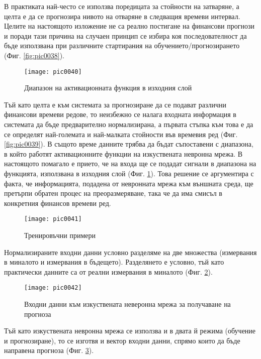 В практиката най-често се използва поредицата за стойности на затваряне, а целта е да се прогнозира нивото на отваряне в следващия времеви интервал. Целите на настоящото изложение не са реално постигане на финансови прогнози и поради тази причина на случаен принцип се избира коя последователност да бъде използвана при различните стартирания на обучението/прогнозирането (Фиг. \ref{fig:pic0038}).

\begin{figure}[h]
  \centering
  \texttt{[image: pic0040]}
  \caption{Диапазон на активационната функция в изходния слой}
\label{fig:pic0040}
\end{figure}
\FloatBarrier

Тъй като целта е към системата за прогнозиране да се подават различни финансови времеви редове, то неизбежно се налага входната информация в системата да бъде предварително нормализирана, а първата стъпка към това е да се определят най-големата и най-малката стойности във времевия ред (Фиг. \ref{fig:pic0039}). В същото време данните трябва да бъдат съпоставени с диапазона, в който работят активационните функции на изкуствената невронна мрежа. В настоящото помагало е прието, че на входа ще се подадат сигнали в диапазона на функцията, използвана в изходния слой (Фиг. \ref{fig:pic0040}). Това решение се аргументира с факта, че информацията, подадена от невронната мрежа към външната среда, ще претърпи обратен процес на преоразмеряване, така че да има смисъл в конкретния финансов времеви ред.

\begin{figure}[h]
  \centering
  \texttt{[image: pic0041]}
  \caption{Тренировъчни примери}
\label{fig:pic0041}
\end{figure}
\FloatBarrier

Нормализираните входни данни условно разделяме на две множества (измервания в миналото и измервания в бъдещето). Разделянето е условно, тъй като практически данните са от реални измервания в миналото (Фиг. \ref{fig:pic0041}).

\begin{figure}[h]
  \centering
  \texttt{[image: pic0042]}
  \caption{Входни данни към изкуствената неверонна мрежа за получаване на прогноза}
\label{fig:pic0042}
\end{figure}
\FloatBarrier

Тъй като изкуствената невронна мрежа се използва и в двата й режима (обучение и прогнозиране), то се изготвя и вектор входни данни, спрямо които да бъде направена прогноза (Фиг. \ref{fig:pic0042}).

